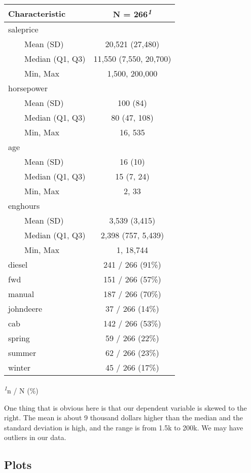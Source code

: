 \documentclass[
]{article}
\begin{document}
\begingroup
\fontsize{12.0pt}{14.4pt}\selectfont
\setlength{\LTpost}{0mm}
\begin{longtable}{lc}
\toprule
\textbf{Characteristic} & \textbf{N = 266}\textsuperscript{\textit{1}} \\ 
\midrule\addlinespace[2.5pt]
saleprice &  \\ 
    Mean (SD) & 20,521 (27,480) \\ 
    Median (Q1, Q3) & 11,550 (7,550, 20,700) \\ 
    Min, Max & 1,500, 200,000 \\ 
horsepower &  \\ 
    Mean (SD) & 100 (84) \\ 
    Median (Q1, Q3) & 80 (47, 108) \\ 
    Min, Max & 16, 535 \\ 
age &  \\ 
    Mean (SD) & 16 (10) \\ 
    Median (Q1, Q3) & 15 (7, 24) \\ 
    Min, Max & 2, 33 \\ 
enghours &  \\ 
    Mean (SD) & 3,539 (3,415) \\ 
    Median (Q1, Q3) & 2,398 (757, 5,439) \\ 
    Min, Max & 1, 18,744 \\ 
diesel & 241 / 266 (91\%) \\ 
fwd & 151 / 266 (57\%) \\ 
manual & 187 / 266 (70\%) \\ 
johndeere & 37 / 266 (14\%) \\ 
cab & 142 / 266 (53\%) \\ 
spring & 59 / 266 (22\%) \\ 
summer & 62 / 266 (23\%) \\ 
winter & 45 / 266 (17\%) \\ 
\bottomrule
\end{longtable}
\begin{minipage}{\linewidth}
\textsuperscript{\textit{1}}n / N (\%)\\
\end{minipage}
\endgroup

One thing that is obvious here is that our dependent variable is skewed
to the right. The mean is about 9 thousand dollars higher than the
median and the standard deviation is high, and the range is from 1.5k to
200k. We may have outliers in our data.

\subsection{Plots}\label{plots}
\end{document}
